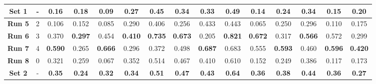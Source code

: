 \begin{table}[!ht]
{\begin{tabular}{|c|c|ccc|ccc|ccc|c|c|c|c|}
		\hline
	
		\textbf{Set 1} & - & \multicolumn{1}{c|}{0.16} & \multicolumn{1}{c|}{0.18} & 0.09 & \multicolumn{1}{c|}{0.27} & \multicolumn{1}{c|}{0.45} & 0.34 & \multicolumn{1}{c|}{0.33} & \multicolumn{1}{c|}{0.49} & 0.14 & 0.24 & 0.34 & 0.15 & 0.20 \\ 
	
		\hline
		\hline
	
		\textbf{Run 5} & 2 & \multicolumn{1}{c|}{0.106} & \multicolumn{1}{c|}{0.152} & 0.085 & \multicolumn{1}{c|}{0.290} & \multicolumn{1}{c|}{0.406} & 0.256 & \multicolumn{1}{c|}{0.433} & \multicolumn{1}{c|}{0.443} & 0.065 & 0.250 & 0.296 & 0.110 & 0.175 \\
		
		\textbf{Run 6} & 3 & \multicolumn{1}{c|}{0.370} & \multicolumn{1}{c|}{\textbf{0.297}} & 0.454 & \multicolumn{1}{c|}{\textbf{0.410}} & \multicolumn{1}{c|}{\textbf{0.735}} & \textbf{0.673} & \multicolumn{1}{c|}{0.205} & \multicolumn{1}{c|}{\textbf{0.821}} & \textbf{0.672} & 0.317 & \textbf{0.566} & 0.572 & 0.299 \\
		
		\textbf{Run 7} & 4 & \multicolumn{1}{c|}{\textbf{0.590}} & \multicolumn{1}{c|}{0.265} & \textbf{0.666} & \multicolumn{1}{c|}{0.296} & \multicolumn{1}{c|}{0.372} & 0.498 & \multicolumn{1}{c|}{\textbf{0.687}} & \multicolumn{1}{c|}{0.683} & 0.555 & \textbf{0.593} & 0.460 & \textbf{0.596} & \textbf{0.420} \\ 
		
		\textbf{Run 8} & 0 & \multicolumn{1}{c|}{0.321} & \multicolumn{1}{c|}{0.259} & 0.067 & \multicolumn{1}{c|}{0.352} & \multicolumn{1}{c|}{0.514} & 0.467 & \multicolumn{1}{c|}{0.410} & \multicolumn{1}{c|}{0.610} & 0.152 & 0.249 & 0.386 & 0.117 & 0.173 \\ 
		
		\hline
		
		\textbf{Set 2} & - & \multicolumn{1}{c|}{\textbf{0.35}} & \multicolumn{1}{c|}{\textbf{0.24}} & \textbf{0.32} & \multicolumn{1}{c|}{\textbf{0.34}} & \multicolumn{1}{c|}{\textbf{0.51}} & \textbf{0.47} & \multicolumn{1}{c|}{\textbf{0.43}} & \multicolumn{1}{c|}{\textbf{0.64}} & \textbf{0.36} & \textbf{0.38} & \textbf{0.44} & \textbf{0.36} & \textbf{0.27} \\ 
	
		\hline

	\end{tabular}}
	\label{tab:Experiment1.1Results}
\end{table}

